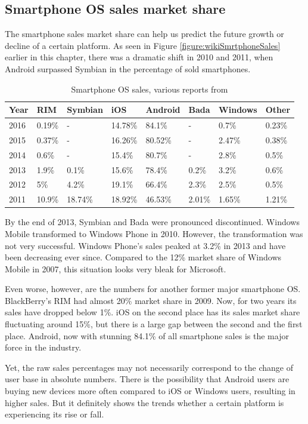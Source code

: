 \documentclass[english,master,public,dept460,male,cpdeclaration,oneside]{diploma}
\begin{document}
\subsection{Smartphone OS sales market share}
The smartphone sales market share can help us predict the future growth or decline of a certain platform. As seen in Figure \ref{figure:wikiSmrtphoneSales} earlier in this chapter, there was a dramatic shift in 2010 and 2011, when Android surpassed Symbian in the percentage of sold smartphones.

\begin{table}
	\centering
	\caption{Smartphone OS sales, various reports from \cite{gartner}}
	\begin{tabular}{l l l l l l l l}
		\toprule
		Year & RIM & Symbian & iOS & Android & Bada & Windows & Other\\
		\midrule		
		2016 & 0.19\% & - & 14.78\% & 84.1\% & - & 0.7\% & 0.23\% \\
		2015 & 0.37\% & - & 16.26\% & 80.52\% & - & 2.47\% & 0.38\% \\
		2014 & 0.6\% & - & 15.4\% & 80.7\% & - & 2.8\% & 0.5\% \\
		2013 & 1.9\% & 0.1\% & 15.6\% & 78.4\% & 0.2\% & 3.2\% & 0.6\% \\
		2012 & 5\% & 4.2\% & 19.1\% & 66.4\% & 2.3\% & 2.5\% & 0.5\% \\
		2011 & 10.9\% & 18.74\% & 18.92\% & 46.53\% & 2.01\% & 1.65\% & 1.21\% \\
		\midrule		
	\end{tabular}
\end{table}

By the end of 2013, Symbian and Bada were pronounced discontinued. Windows Mobile transformed to Windows Phone in 2010. However, the transformation was not very successful. Windows Phone’s sales peaked at 3.2\% in 2013 and have been decreasing ever since. Compared to the 12\% market share of Windows Mobile in 2007, this situation looks very bleak for Microsoft. 

Even worse, however, are the numbers for another former major smartphone OS. BlackBerry’s RIM had almost 20\% market share in 2009. Now, for two years its sales have dropped below 1\%. iOS on the second place has its sales market share fluctuating around 15\%, but there is a large gap between the second and the first place. Android, now with stunning 84.1\% of all smartphone sales is the major force in the industry. 

Yet, the raw sales percentages may not necessarily correspond to the change of user base in absolute numbers. There is the possibility that Android users are buying new devices more often compared to iOS or Windows users, resulting in higher sales. But it definitely shows the trends whether a certain platform is experiencing its rise or fall.
\end{document}
